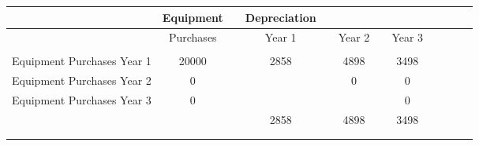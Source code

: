 {\begin{longtable}[c]{|c|c|c|c|c|c|c|c|c|c|c|c|}
\hline
                                                                                                                                & Equipment                         &  & Depreciation &  &           &  &           &  &           &  &           \\
\hline
                                                                                                                                & Purchases                         &  & Year 1       &  & Year 2    &  & Year 3    &  &           &  &           \\
\hline
                                                                                                                                &                                   &  &              &  &           &  &           &  &           &  &           \\
\hline
Equipment Purchases Year 1                                                                                                      & 20000                             &  & 2858         &  & 4898      &  & 3498      &  &           &  &           \\
\hline
Equipment Purchases Year 2                                                                                                      & 0                                 &  &              &  & 0         &  & 0         &  &           &  &           \\
\hline
Equipment Purchases Year 3                                                                                                      & 0                                 &  &              &  &           &  & 0         &  &           &  &           \\
\hline
                                                                                                                                &                                   &  & 2858         &  & 4898      &  & 3498      &  &           &  &           \\
\hline
                                                                                                                                &                                   &  &              &  &           &  &           &  &           &  &           \\
\hline
                                                                                                                                &                                   &  &              &  &           &  &           &  &           &  &           \\

\end{longtable}}
